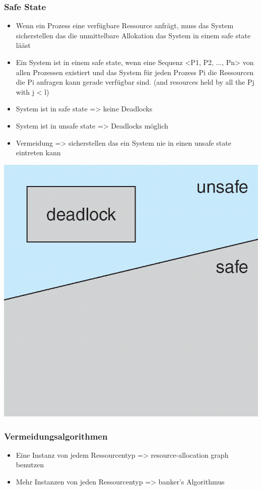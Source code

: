 \documentclass[a4paper]{scrreprt}
\begin{document}
			\subsubsection{Safe State}
				\begin{itemize}
					\item Wenn ein Prozess eine verfügbare Ressource anfrägt, muss das System sicherstellen das die unmittelbare Allokation das System in einem safe state lääst
					\item Ein System ist in einem safe state, wenn eine Sequenz <P1, P2, ..., Pn> von allen Prozessen existiert und das System für jeden Prozess Pi die Ressourcen die Pi anfragen kann gerade verfügbar sind. (and resources held by all the Pj with j < l)
				\end{itemize}
				\begin{itemize}
					\item System ist in safe state => keine Deadlocks
					\item System ist in unsafe state => Deadlocks möglich
					\item Vermeidung => sicherstellen das ein System nie in einen unsafe state eintreten kann
				\end{itemize}
				\includegraphics[scale=0.15] {state.png}
			
			\subsubsection{Vermeidungsalgorithmen}
				\begin{itemize}
					\item Eine Instanz von jedem Ressourcentyp => resource-allocation graph benutzen
					\item Mehr Instanzen von jeden Ressourcentyp => banker's Algorithmus
				\end{itemize}
\end{document}
